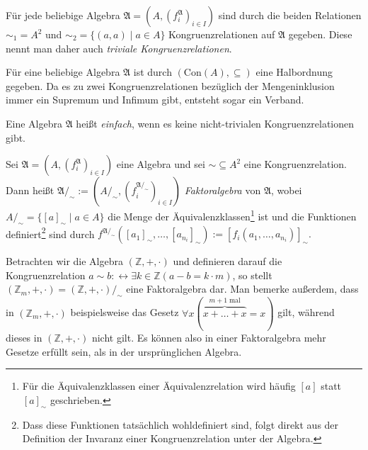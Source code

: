 \begin{example}
    Für jede beliebige Algebra $\mathfrak{A}=(A,(f^\mathfrak{A}_i)_{i\in I})$ sind durch die beiden Relationen $\sim_1=A^2$ und $\sim_2=\{(a,a)\mid a\in A\}$
    Kongruenzrelationen auf $\mathfrak{A}$ gegeben. Diese nennt man daher auch \emph{triviale Kongruenzrelationen}.
\end{example}

\begin{remark}
    Für eine beliebige Algebra $\mathfrak{A}$ ist durch $(\text{Con}(A),\subseteq)$ eine Halbordnung gegeben.
    Da es zu zwei Kongruenzrelationen bezüglich der Mengeninklusion immer ein Supremum und Infimum gibt,
    entsteht sogar ein Verband.
\end{remark}

\begin{definition} \label{def:einfache-algebra}
    Eine Algebra $\mathfrak{A}$ heißt \emph{einfach}, wenn es keine nicht-trivialen Kongruenzrelationen gibt.
\end{definition}

\begin{definition}
    Sei $\mathfrak{A}=(A,(f^\mathfrak{A}_i)_{i\in I})$ eine Algebra und sei $\sim\subseteq A^2$ eine Kongruenzrelation.
    Dann heißt $\mathfrak{A}/_\sim:=(A/_\sim,(f^{\mathfrak{A}/_\sim}_i)_{i\in I})$ \emph{Faktoralgebra} von $\mathfrak{A}$,
    wobei $A/_\sim=\{[a]_\sim\mid a\in A\}$ die Menge der Äquivalenzklassen\footnote{Für die Äquivalenzklassen einer Äquivalenzrelation
    wird häufig $[a]$ statt $[a]_\sim$ geschrieben.} ist und die Funktionen definiert\footnote{Dass diese Funktionen tatsächlich wohldefiniert sind,
    folgt direkt aus der Definition der Invaranz einer Kongruenzrelation unter der Algebra.} sind durch
    $f^{\mathfrak{A}/_\sim}([a_1]_\sim,\ldots,[a_{n_i}]_\sim):=[f_i(a_1,\ldots,a_{n_i})]_\sim.$
\end{definition}

\begin{example}
    Betrachten wir die Algebra $(\mathbb{Z},+,\cdot)$ und definieren darauf die Kongruenzrelation
    $a\sim b:\leftrightarrow \exists k\in\mathbb{Z}(a-b=k\cdot m)$, so stellt $(\mathbb{Z}_m,+,\cdot)=(\mathbb{Z},+,\cdot)/_\sim$
    eine Faktoralgebra dar. Man bemerke außerdem, dass in $(\mathbb{Z}_m,+,\cdot)$ beispielsweise das Gesetz
    $\forall x(\overbrace{x +\ldots + x}^{m+1\;\text{mal}}=x)$ gilt, während dieses in $(\mathbb{Z},+,\cdot)$ nicht gilt. Es können also in einer Faktoralgebra mehr Gesetze erfüllt sein, als in der ursprünglichen Algebra.
\end{example}

